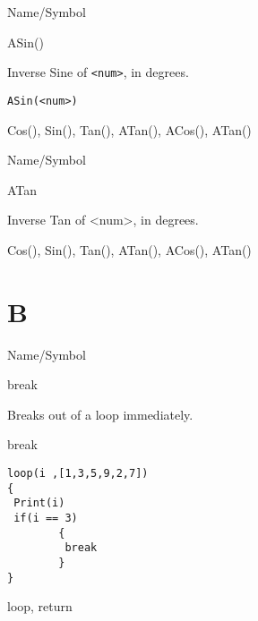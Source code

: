 \rl



\begin{desc}{Name/Symbol}

\item[Name/Symbol]  	ASin() 

\item[Description]  	Inverse Sine of \verb+<num>+, in degrees.

\item[Usage]
\begin{verbatim}
ASin(<num>)
\end{verbatim}

\item[Example]	

\item[See Also]    	Cos(), Sin(), Tan(), ATan(), ACos(), ATan() 
\end{desc}

\rl



\begin{desc}{Name/Symbol}

\item[Name/Symbol]  	ATan 

\item[Description]  	Inverse Tan of <num>, in degrees.

\item[Usage]		

\item[Example]	

\item[See Also]    	Cos(), Sin(), Tan(), ATan(), ACos(), ATan() 
\end{desc}

\rl

\section{B}
\rl


\begin{desc}{Name/Symbol}
\item[Name/Symbol]  	break

\item[Description]  	Breaks out of a loop immediately.

\item[Usage]        	break

\item[Example]
\begin{verbatim}
loop(i ,[1,3,5,9,2,7])
{
 Print(i)
 if(i == 3) 
        {
         break
        }
}
\end{verbatim}

\item[See Also]   	loop, return
\end{desc}

